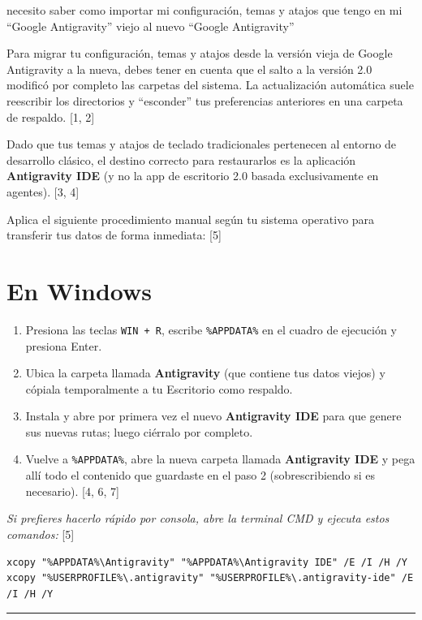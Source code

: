 \documentclass[12pt, a4paper]{article}
\begin{document}
necesito saber como importar mi configuración, temas y atajos que tengo en mi ``Google Antigravity'' viejo al nuevo ``Google Antigravity''

Para migrar tu configuración, temas y atajos desde la versión vieja de Google Antigravity a la nueva, debes tener en cuenta que el salto a la versión 2.0 modificó por completo las carpetas del sistema. La actualización automática suele reescribir los directorios y ``esconder'' tus preferencias anteriores en una carpeta de respaldo. [1, 2]

Dado que tus temas y atajos de teclado tradicionales pertenecen al entorno de desarrollo clásico, el destino correcto para restaurarlos es la aplicación \textbf{Antigravity IDE} (y no la app de escritorio 2.0 basada exclusivamente en agentes). [3, 4]

Aplica el siguiente procedimiento manual según tu sistema operativo para transferir tus datos de forma inmediata: [5]

\section*{En Windows}

\begin{enumerate}
    \item Presiona las teclas \texttt{WIN + R}, escribe \texttt{\%APPDATA\%} en el cuadro de ejecución y presiona Enter.
    \item Ubica la carpeta llamada \textbf{Antigravity} (que contiene tus datos viejos) y cópiala temporalmente a tu Escritorio como respaldo.
    \item Instala y abre por primera vez el nuevo \textbf{Antigravity IDE} para que genere sus nuevas rutas; luego ciérralo por completo.
    \item Vuelve a \texttt{\%APPDATA\%}, abre la nueva carpeta llamada \textbf{Antigravity IDE} y pega allí todo el contenido que guardaste en el paso 2 (sobrescribiendo si es necesario). [4, 6, 7]
\end{enumerate}

\textit{Si prefieres hacerlo rápido por consola, abre la terminal CMD y ejecuta estos comandos:} [5]

\begin{verbatim}
xcopy "%APPDATA%\Antigravity" "%APPDATA%\Antigravity IDE" /E /I /H /Y
xcopy "%USERPROFILE%\.antigravity" "%USERPROFILE%\.antigravity-ide" /E /I /H /Y
\end{verbatim}

\noindent\rule{\textwidth}{0.4pt}
\end{document}
